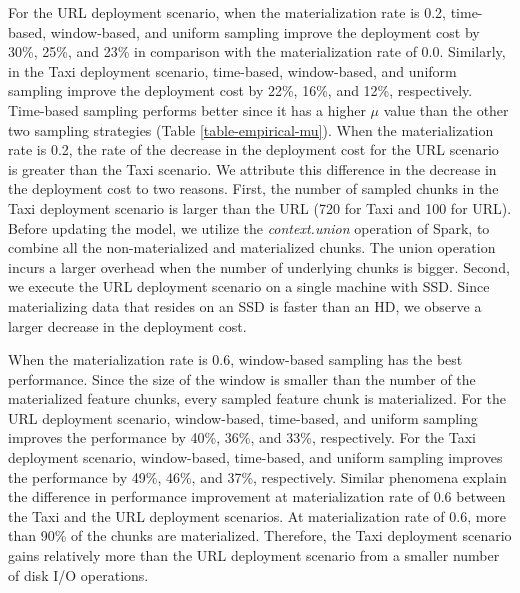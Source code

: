 For the URL deployment scenario, when the materialization rate is 0.2, time-based, window-based, and uniform sampling improve the deployment cost by 30\%, 25\%, and 23\% in comparison with the materialization rate of 0.0.
Similarly, in the Taxi deployment scenario, time-based, window-based, and uniform sampling improve the deployment cost by 22\%, 16\%, and 12\%, respectively. 
Time-based sampling performs better since it has a higher $\mu$ value than the other two sampling strategies (Table \ref{table-empirical-mu}).
When the materialization rate is 0.2, the rate of the decrease in the deployment cost for the URL scenario is greater than the Taxi scenario.
We attribute this difference in the decrease in the deployment cost to two reasons.
First, the number of sampled chunks in the Taxi deployment scenario is larger than the URL (720 for Taxi and 100 for URL).
Before updating the model, we utilize the \textit{context.union} operation of Spark, to combine all the non-materialized and materialized chunks.
The union operation incurs a larger overhead when the number of underlying chunks is bigger.
Second, we execute the URL deployment scenario on a single machine with SSD.
Since materializing data that resides on an SSD is faster than an HD, we observe a larger decrease in the deployment cost.

When the materialization rate is 0.6, window-based sampling has the best performance.
Since the size of the window is smaller than the number of the materialized feature chunks, every sampled feature chunk is materialized.
For the URL deployment scenario, window-based, time-based, and uniform sampling improves the performance by 40\%, 36\%, and 33\%, respectively.
For the Taxi deployment scenario, window-based, time-based, and uniform sampling improves the performance by 49\%, 46\%, and 37\%, respectively.
Similar phenomena explain the difference in performance improvement at materialization rate of 0.6 between the Taxi and the URL deployment scenarios.
At materialization rate of 0.6, more than 90\% of the chunks are materialized.
Therefore, the Taxi deployment scenario gains relatively more than the URL deployment scenario from a smaller number of disk I/O operations.

